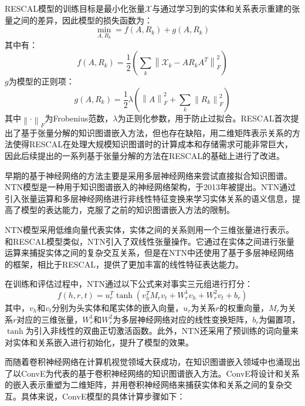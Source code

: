 RESCAL模型的训练目标是最小化张量$\mathcal{X}$与通过学习到的实体和关系表示重建的张量之间的差异，因此模型的损失函数为：
\begin{equation}
  \min_{A,R_k} = f(A,R_k)+g(A,R_k)
\end{equation}
其中有：
\begin{equation}
  f(A,R_k)=\frac{1}{2}\left(\sum_k \left\lVert \mathcal{X}_k - AR_kA^T\right\rVert^2_F \right) 
\end{equation}
$g$为模型的正则项：
\begin{equation}
  g(A,R_k)=\frac{1}{2}\lambda \left(\left\lVert A\right\rVert^2_F+\sum_k\left\lVert R_k\right\rVert^2_F  \right) 
\end{equation}
其中$\left\lVert \cdot \right\rVert _F $为Frobenius范数，$\lambda$为正则化参数，用于防止过拟合。RESCAL首次提出了基于张量分解的知识图谱嵌入方法，但也存在缺陷，用二维矩阵表示关系的方法使得RESCAL在处理大规模知识图谱时的计算成本和存储需求可能非常巨大，因此后续提出的一系列基于张量分解的方法在RESCAL的基础上进行了改进。

早期的基于神经网络的方法主要是采用多层神经网络来尝试直接拟合知识图谱。NTN模型是一种用于知识图谱嵌入的神经网络架构，于2013年被提出。NTN通过引入张量运算和多层神经网络进行非线性特征变换来学习实体关系的语义信息，提高了模型的表达能力，克服了之前的知识图谱嵌入方法的限制。

NTN模型采用低维向量代表实体，实体之间的关系则用一个三维张量进行表示。和RESCAL模型类似，NTN引入了双线性张量操作。它通过在实体之间进行张量运算来捕捉实体之间的复杂交互关系，但是在NTN中还使用了基于多层神经网络的框架，相比于RESCAL，提供了更加丰富的线性特征表达能力。

在训练和评估过程中，NTN通过以下公式来对事实三元组进行打分：
\begin{equation}
  f(h,r,t) = u_r^T \tanh\left(v_h^T M_r v_t + W_r^1v_h + W_r^2v_t + b_r\right) 
\end{equation}
其中，$v_h$和$v_t$分别为头实体和尾实体的嵌入向量，$u_r$为关系$r$的权重向量，$M_r$为关系$r$对应的三维张量，$W_r^1$和$W_r^2$为多层神经网络对应的线性变换矩阵，$b_r$为偏置项，$\tanh$为引入非线性的双曲正切激活函数。此外，NTN还采用了预训练的词向量来对实体和关系嵌入进行初始化，提升了模型的效果。

而随着卷积神经网络在计算机视觉领域大获成功，在知识图谱嵌入领域中也涌现出了以ConvE为代表的基于卷积神经网络的知识图谱嵌入方法。ConvE将设计和关系的嵌入表示重塑为二维矩阵，并用卷积神经网络来捕获实体和关系之间的复杂交互。具体来说，ConvE模型的具体计算步骤如下：

